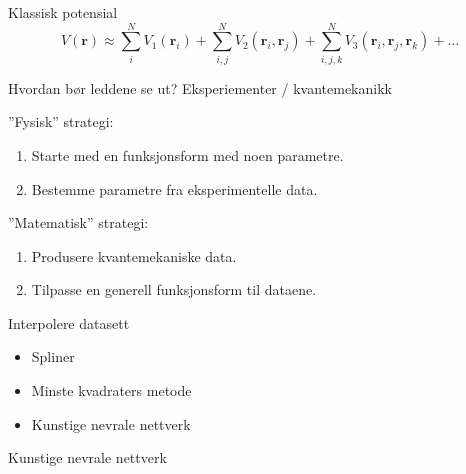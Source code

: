 \documentclass{beamer}
\begin{document}
\begin{frame}

\begin{block}{Klassisk potensial}
  \begin{equation*}
  V(\mathbf{r}) \approx \sum_i^N V_1(\mathbf{r}_i) + \sum_{i,j}^N V_2(\mathbf{r}_i, \mathbf{r}_j) + 
  \sum_{i,j,k}^N V_3(\mathbf{r}_i, \mathbf{r}_j, \mathbf{r}_k) + \dots
  \end{equation*}
\end{block}

\begin{block}{Hvordan bør leddene se ut?}
Eksperiementer / kvantemekanikk
\end{block}

\end{frame}


\begin{frame}

\begin{block}{''Fysisk'' strategi:}
 \begin{enumerate}
  \item Starte med en funksjonsform med noen parametre.
  \item Bestemme parametre fra eksperimentelle data.
 \end{enumerate}
\end{block}

\begin{block}{''Matematisk'' strategi:}
 \begin{enumerate}
  \item Produsere kvantemekaniske data. 
  \item Tilpasse en generell funksjonsform til dataene.
 \end{enumerate}
\end{block}

\end{frame}


\begin{frame}
 
\begin{block}{Interpolere datasett}
 \begin{itemize}
  \item Spliner
  \item Minste kvadraters metode
  \item Kunstige nevrale nettverk
 \end{itemize}
\end{block}
 
\end{frame}


\begin{frame}
 
\begin{block}{Kunstige nevrale nettverk}
 
\end{block}

 
\end{frame}
\end{document}

